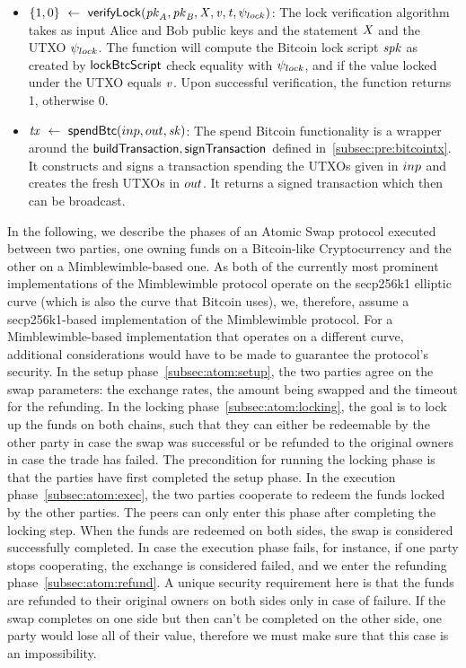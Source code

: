 \begin{itemize}
    \item $\{ 1,0 \} ~\leftarrow~ \mathsf{verifyLock} (\mathit{pk}_{\mathit{A}},\mathit{pk}_{\mathit{B}},\mathit{X},\mathit{v},\mathit{t},\psi_{lock})$:
    The lock verification algorithm takes as input Alice and Bob public keys and the statement $\mathit{X}$ and the UTXO $\psi_{lock}$.
    The function will compute the Bitcoin lock script $\mathit{spk}$ as created by $\mathsf{lockBtcScript}$ check equality with $\psi_{lock}$, and if the value locked under the UTXO equals $\mathit{v}$.
    Upon successful verification, the function returns 1, otherwise 0.
    \item $\mathit{tx} ~\leftarrow~ \mathsf{spendBtc}(inp,out,\mathit{sk})$:
    The spend Bitcoin functionality is a wrapper around the $\mathsf{buildTransaction}, \mathsf{signTransaction}$ defined in~\cref{subsec:pre:bitcointx}.
    It constructs and signs a transaction spending the UTXOs given in $inp$ and creates the fresh UTXOs in $out$.
    It returns a signed transaction which then can be broadcast.
\end{itemize}


In the following, we describe the phases of an Atomic Swap protocol executed between two parties, one owning funds on a Bitcoin-like Cryptocurrency and the other on a Mimblewimble-based one.
As both of the currently most prominent implementations of the Mimblewimble protocol operate on the secp256k1 elliptic curve (which is also the curve that Bitcoin uses), we, therefore, assume a secp256k1-based implementation of the Mimblewimble protocol.
For a Mimblewimble-based implementation that operates on a different curve, additional considerations would have to be made to guarantee the protocol's security.
In the setup phase~\cref{subsec:atom:setup}, the two parties agree on the swap parameters: the exchange rates, the amount being swapped and the timeout for the refunding.
In the locking phase~\cref{subsec:atom:locking}, the goal is to lock up the funds on both chains, such that they can either be redeemable by the other party in case the swap was successful or be refunded to the original owners in case the trade has failed.
The precondition for running the locking phase is that the parties have first completed the setup phase.
In the execution phase~\cref{subsec:atom:exec}, the two parties cooperate to redeem the funds locked by the other parties.
The peers can only enter this phase after completing the locking step.
When the funds are redeemed on both sides, the swap is considered successfully completed.
In case the execution phase fails, for instance, if one party stops cooperating, the exchange is considered failed, and we enter the refunding phase~\cref{subsec:atom:refund}.
A unique security requirement here is that the funds are refunded to their original owners on both sides only in case of failure.
If the swap completes on one side but then can't be completed on the other side, one party would lose all of their value, therefore we must make sure that this case is an impossibility.

